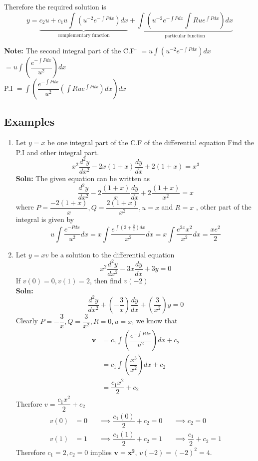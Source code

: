 \documentclass[a4paper, titlepage]{article}
\begin{document}
Therefore the required solution is 
\[ y = \underbrace{c_2u + c_1u\displaystyle\int \left(u^{-2}e^{-\int Pdx} \right) dx}_{\text{complementary function}} + \underbrace{\displaystyle\int \left( u^{-2}e^{-\int Pdx}\displaystyle\int Rue^{\int Pdx} \right) dx}_{\text{particular function}} \]
\begin{tabbing}
    \textbf{Note: }The second integral part of the \= C.F 
    \= $= u\displaystyle\int \left( u^{-2}e^{-\int Pdx} \right) dx$ \\
    \> \> $= u\displaystyle\int \left( \dfrac{e^{-\int Pdx}}{u^2} \right) dx$ \\
    \> P.I \> $ = \displaystyle\int \left( \dfrac{e^{-\int Pdx}}{u^2} \left( \int Rue^{\int Pdx} \right) dx \right) dx$
\end{tabbing}

\subsection{Examples}
\begin{enumerate}[label=\textbf{\arabic*}]
    \item 
    Let $y = x$ be one integral part of the C.F of the differential equation
    Find the P.I and other integral part.
    \[ x^2\dfrac{d^2y}{dx^2} - 2x(1+x)\dfrac{dy}{dx} + 2(1+x) = x^3 \]
    \textbf{Soln: }
    The given equation can be written as 
    \[ \dfrac{d^2y}{dx^2} - 2\dfrac{(1+x)}{x} \dfrac{dy}{dx} + 2\dfrac{(1+x)}{x^2} = x \]
    where $P = \dfrac{-2(1+x)}{x}, Q = \dfrac{2(1+x)}{x^2}, u = x$ and $R = x$
    , other part of the integral is given by
    \[ 
        u\displaystyle\int \dfrac{e^{-Pdx}}{u^2} dx = 
        x\displaystyle\int \dfrac{e^{\int\left( 2 + \frac{2}{x} \right)dx}}{x^2} dx =
        x\displaystyle\int \dfrac{e^{2x}x^2}{x^2} dx = \dfrac{xe^2}{2}
    \]
    \item Let $y = xv$ be a solution to the differential equation
    \[ x^2\dfrac{d^2y}{dx^2} - 3x\dfrac{dy}{dx} + 3y = 0 \]
    If $v(0) = 0, v(1) = 2$, then find $v(-2)$ \hfill \\
    \textbf{Soln: } 
    \[ \dfrac{d^2y}{dx^2} + \left( -\dfrac{3}{x} \right) \dfrac{dy}{dx} + \left( \dfrac{3}{x^2} \right) y = 0 \]
    Clearly $P = -\dfrac{3}{x}, Q = \dfrac{3}{x^2}, R = 0, u = x$, 
    we know that
    \begin{align*}
        \bm{v}   &= c_1\displaystyle\int \left( \dfrac{e^{-\int Pdx}}{u^2} \right) dx + c_2 \\
            &= c_1\displaystyle\int \left( \dfrac{x^3}{x^2} \right) dx + c_2 \\
            &= \dfrac{c_1x^2}{2} + c_2
    \end{align*} 
    Therfore $v = \dfrac{c_1x^2}{2} + c_2$
    \begin{align*}
        v(0) &= 0 && \implies \dfrac{c_1(0)}{2} + c_2 = 0 && \implies c_2 = 0 \\
        v(1) &= 1 && \implies \dfrac{c_1(1)}{2} + c_2 = 1 && \implies \dfrac{c_1}{2} + c_2 = 1
    \end{align*}
    Therefore $c_1 = 2, c_2 = 0$ implies $\bm{v = x^2}$, $v(-2) = (-2)^2 = 4$.
\end{enumerate}
\end{document}
